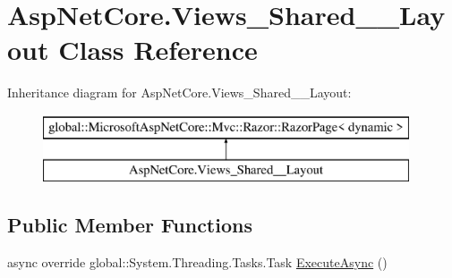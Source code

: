 \hypertarget{class_asp_net_core_1_1_views___shared_____layout}{}\section{Asp\+Net\+Core.\+Views\+\_\+\+Shared\+\_\+\+\_\+\+Layout Class Reference}
\label{class_asp_net_core_1_1_views___shared_____layout}
Inheritance diagram for Asp\+Net\+Core.\+Views\+\_\+\+Shared\+\_\+\+\_\+\+Layout\+:\begin{figure}[H]
\begin{center}
\leavevmode
\includegraphics[height=2.000000cm]{class_asp_net_core_1_1_views___shared_____layout}
\end{center}
\end{figure}
\subsection*{Public Member Functions}
\begin{DoxyCompactItemize}
\item 
async override global\+::\+System.\+Threading.\+Tasks.\+Task \mbox{\hyperlink{class_asp_net_core_1_1_views___shared_____layout_ab6d0133c47f42aa6e823d599891346cc}{Execute\+Async}} ()
\end{DoxyCompactItemize}
